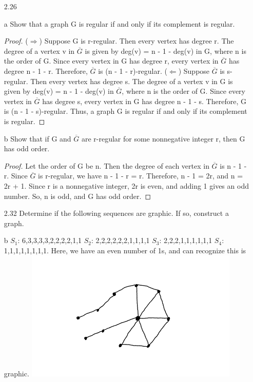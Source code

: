 \documentclass[12pt]{article}
\begin{document}
\begin{enumerate}
\item[2.26] 
\item[a] Show that a graph G is regular if and only if its complement is regular.
\begin{proof}
    ($\Rightarrow$) Suppose G is r-regular. Then every vertex has degree r. 
    The degree of a vertex v in $\overline{G}$ is given by deg(v) = n - 1 - deg(v) in G, where n is the order of G.
    Since every vertex in G has degree r, every vertex in $\overline{G}$ has degree n - 1 - r. Therefore, $\overline{G}$ is (n - 1 - r)-regular.
    \newline
    ($\Leftarrow$) Suppose $\overline{G}$ is s-regular. Then every vertex has degree s. 
    The degree of a vertex v in G is given by deg(v) = n - 1 - deg(v) in $\overline{G}$, where n is the order of G.
    Since every vertex in $\overline{G}$ has degree s, every vertex in G has degree n - 1 - s. Therefore, G is (n - 1 - s)-regular.
    \newline
    Thus, a graph G is regular if and only if its complement is regular.
\end{proof} 


\item[b] Show that if G and $\overline{G}$ are r-regular for some nonnegative integer r, then G has odd order.
\begin{proof}
    Let the order of G be n. Then the degree of each vertex in $\overline{G}$ is n - 1 - r. Since $\overline{G}$ is r-regular, we have n - 1 - r = r. 
    Therefore, n - 1 = 2r, and n = 2r + 1. Since r is a nonnegative integer, 2r is even, and adding 1 gives an odd number. 
    So, n is odd, and G has odd order.
\end{proof}

\item[2.32] Determine if the following sequences are graphic. If so, construct a graph.
\item[b] 
    $S_1$: 6,3,3,3,3,2,2,2,2,1,1
    \newline
    $S_2$: 2,2,2,2,2,2,1,1,1,1
    \newline
    $S_3$: 2,2,2,1,1,1,1,1,1
    \newline
    $S_4$: 1,1,1,1,1,1,1,1. Here, we have an even number of 1s, and can recognize this is graphic.
    \newline
    \includegraphics{grapha.png}



\end{enumerate}
\end{document}
